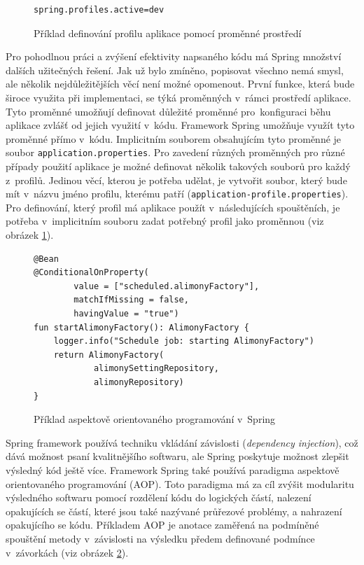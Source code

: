         \begin{figure}
            \begin{verbatim}
spring.profiles.active=dev
            \end{verbatim}
            \caption{Příklad definování profilu aplikace pomocí proměnné prostředí} 
            \label{code:current-spring-profile}
        \end{figure}
        Pro pohodlnou práci a zvýšení efektivity napsaného kódu má Spring množství dalších užitečných řešení. Jak už bylo zmíněno, popisovat všechno nemá smysl, ale několik nejdůležitějších věcí není možné opomenout. První funkce, která bude široce využita při implementaci, se týká proměnných v~rámci prostředí aplikace. Tyto proměnné umožňují definovat důležité proměnné pro~konfiguraci běhu aplikace zvlášť od jejich využití v~kódu. Framework Spring umožňuje využít tyto proměnné přímo v~kódu. Implicitním souborem obsahujícím tyto proměnné je soubor \texttt{application.properties}. Pro zavedení různých proměnných pro různé případy použití aplikace je možné definovat několik takových souborů pro každý z~profilů. Jedinou věcí, kterou je potřeba udělat, je vytvořit soubor, který bude mít v~názvu jméno profilu, kterému patří (\texttt{application-{profile}.properties}). Pro definování, který profil má aplikace použít v~následujících spouštěních, je potřeba v~implicitním souboru zadat potřebný profil jako proměnnou (viz obrázek \ref{code:current-spring-profile}). 
        
        
        \begin{figure}
            \begin{verbatim}
@Bean
@ConditionalOnProperty(
        value = ["scheduled.alimonyFactory"],
        matchIfMissing = false,
        havingValue = "true")
fun startAlimonyFactory(): AlimonyFactory {
    logger.info("Schedule job: starting AlimonyFactory")
    return AlimonyFactory(
            alimonySettingRepository,
            alimonyRepository)
}
            \end{verbatim}
            \caption{Příklad aspektově orientovaného programování v~Spring} 
            \label{code:spring-conditional}
        \end{figure}
        Spring framework používá techniku vkládání závislosti (\textit{dependency injection}), což dává možnost psaní kvalitnějšího softwaru, ale Spring poskytuje možnost zlepšit výsledný kód ještě více. Framework Spring také používá paradigma aspektově orientovaného programování (AOP). Toto paradigma má za cíl zvýšit modularitu výsledného softwaru pomocí rozdělení kódu do logických částí, nalezení opakujících se částí, které jsou také nazývané průřezové problémy, a nahrazení opakujícího se kódu. Příkladem AOP je anotace zaměřená na podmíněné spouštění metody v~závislosti na výsledku předem definované podmínce v~závorkách (viz obrázek \ref{code:spring-conditional}).
    
